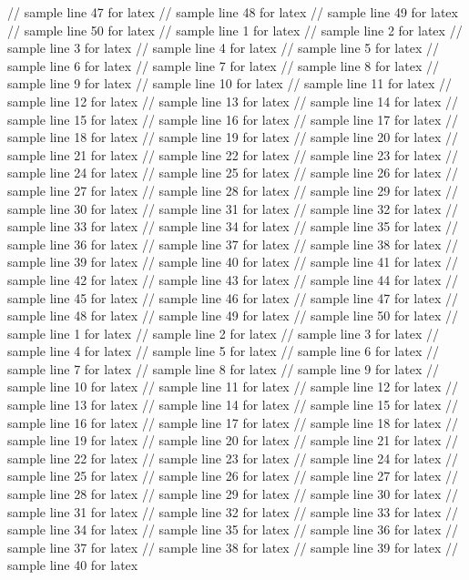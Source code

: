 // sample line 47 for latex
// sample line 48 for latex
// sample line 49 for latex
// sample line 50 for latex
// sample line 1 for latex
// sample line 2 for latex
// sample line 3 for latex
// sample line 4 for latex
// sample line 5 for latex
// sample line 6 for latex
// sample line 7 for latex
// sample line 8 for latex
// sample line 9 for latex
// sample line 10 for latex
// sample line 11 for latex
// sample line 12 for latex
// sample line 13 for latex
// sample line 14 for latex
// sample line 15 for latex
// sample line 16 for latex
// sample line 17 for latex
// sample line 18 for latex
// sample line 19 for latex
// sample line 20 for latex
// sample line 21 for latex
// sample line 22 for latex
// sample line 23 for latex
// sample line 24 for latex
// sample line 25 for latex
// sample line 26 for latex
// sample line 27 for latex
// sample line 28 for latex
// sample line 29 for latex
// sample line 30 for latex
// sample line 31 for latex
// sample line 32 for latex
// sample line 33 for latex
// sample line 34 for latex
// sample line 35 for latex
// sample line 36 for latex
// sample line 37 for latex
// sample line 38 for latex
// sample line 39 for latex
// sample line 40 for latex
// sample line 41 for latex
// sample line 42 for latex
// sample line 43 for latex
// sample line 44 for latex
// sample line 45 for latex
// sample line 46 for latex
// sample line 47 for latex
// sample line 48 for latex
// sample line 49 for latex
// sample line 50 for latex
// sample line 1 for latex
// sample line 2 for latex
// sample line 3 for latex
// sample line 4 for latex
// sample line 5 for latex
// sample line 6 for latex
// sample line 7 for latex
// sample line 8 for latex
// sample line 9 for latex
// sample line 10 for latex
// sample line 11 for latex
// sample line 12 for latex
// sample line 13 for latex
// sample line 14 for latex
// sample line 15 for latex
// sample line 16 for latex
// sample line 17 for latex
// sample line 18 for latex
// sample line 19 for latex
// sample line 20 for latex
// sample line 21 for latex
// sample line 22 for latex
// sample line 23 for latex
// sample line 24 for latex
// sample line 25 for latex
// sample line 26 for latex
// sample line 27 for latex
// sample line 28 for latex
// sample line 29 for latex
// sample line 30 for latex
// sample line 31 for latex
// sample line 32 for latex
// sample line 33 for latex
// sample line 34 for latex
// sample line 35 for latex
// sample line 36 for latex
// sample line 37 for latex
// sample line 38 for latex
// sample line 39 for latex
// sample line 40 for latex
